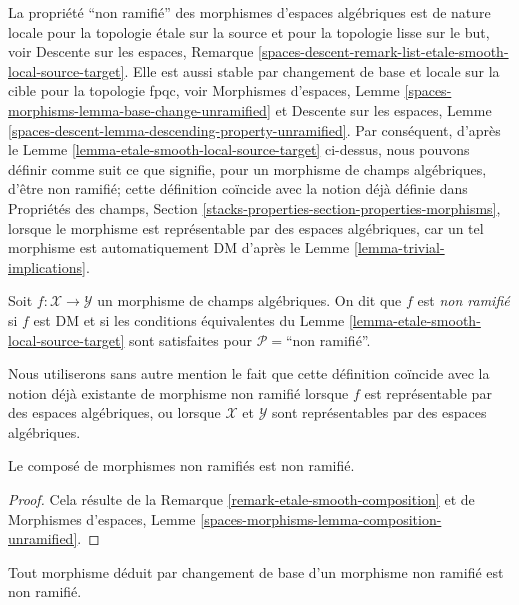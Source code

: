 \medskip\noindent
La propri\'et\'e ``non ramifi\'e'' des morphismes d'espaces alg\'ebriques est de
nature locale pour la topologie \'etale sur la source et pour la topologie lisse sur le but, voir
Descente sur les espaces, Remarque
\ref{spaces-descent-remark-list-etale-smooth-local-source-target}.
Elle est aussi stable par changement de base et locale sur la cible pour la
topologie fpqc, voir Morphismes d'espaces,
Lemme \ref{spaces-morphisms-lemma-base-change-unramified}
et
Descente sur les espaces,
Lemme \ref{spaces-descent-lemma-descending-property-unramified}.
Par cons\'equent, d'apr\`es le
Lemme \ref{lemma-etale-smooth-local-source-target}
ci-dessus, nous pouvons d\'efinir comme suit ce que signifie, pour un morphisme
de champs alg\'ebriques, d'\^etre non ramifi\'e; cette d\'efinition co\"incide avec
la notion d\'ej\`a d\'efinie dans Propri\'et\'es des champs, Section
\ref{stacks-properties-section-properties-morphisms},
lorsque le morphisme est repr\'esentable par des espaces alg\'ebriques,
car un tel morphisme est automatiquement DM d'apr\`es le
Lemme \ref{lemma-trivial-implications}.

\begin{definition}
\label{definition-unramified}
Soit $f : \mathcal{X} \to \mathcal{Y}$ un morphisme de champs alg\'ebriques.
On dit que $f$ est {\it non ramifi\'e} si $f$ est DM et si les conditions
\'equivalentes du Lemme \ref{lemma-etale-smooth-local-source-target}
sont satisfaites pour $\mathcal{P} =$``non ramifi\'e''.
\end{definition}

\noindent
Nous utiliserons sans autre mention le fait que cette d\'efinition co\"incide
avec la notion d\'ej\`a existante de morphisme non ramifi\'e lorsque $f$ est
repr\'esentable par des espaces alg\'ebriques, ou lorsque $\mathcal{X}$ et
$\mathcal{Y}$ sont repr\'esentables par des espaces alg\'ebriques.

\begin{lemma}
\label{lemma-composition-unramified}
Le compos\'e de morphismes non ramifi\'es est non ramifi\'e.
\end{lemma}

\begin{proof}
Cela r\'esulte de la Remarque \ref{remark-etale-smooth-composition}
et de
Morphismes d'espaces, Lemme \ref{spaces-morphisms-lemma-composition-unramified}.
\end{proof}

\begin{lemma}
\label{lemma-base-change-unramified}
Tout morphisme d\'eduit par changement de base d'un morphisme non ramifi\'e est non ramifi\'e.
\end{lemma}

